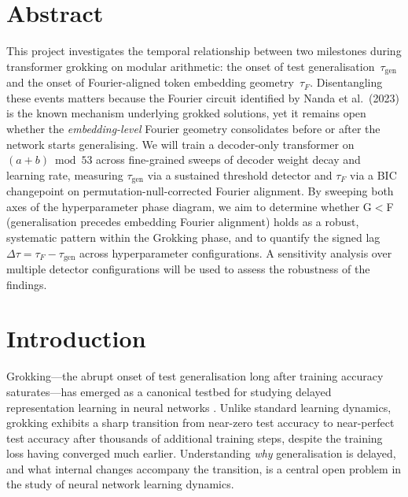 \documentclass[12pt,openany,a4paper]{book}
\newcommand{\taug}{\tau_{\mathrm{gen}}}
\newcommand{\tauf}{\tau_{F}}
\newcommand{\Dtau}{\Delta\tau}
\begin{document}
\chapter{Abstract}

This project investigates the temporal relationship between two
milestones during transformer grokking on modular arithmetic:
the onset of test generalisation~$\taug$ and the onset of
Fourier-aligned token embedding geometry~$\tauf$.
Disentangling these events matters because the Fourier circuit
identified by Nanda et al.\ (2023) is the known mechanism underlying
grokked solutions, yet it remains open whether the \emph{embedding-level}
Fourier geometry consolidates before or after the network starts
generalising.
We will train a decoder-only transformer on $(a+b)\bmod 53$ across
fine-grained sweeps of decoder weight decay and learning rate,
measuring $\taug$ via a sustained threshold detector and $\tauf$ via a
BIC changepoint on permutation-null-corrected Fourier alignment.
By sweeping both axes of the hyperparameter phase diagram, we aim to
determine whether G$<$F (generalisation precedes embedding Fourier
alignment) holds as a robust, systematic pattern within the Grokking
phase, and to quantify the signed lag $\Dtau = \tauf - \taug$ across
hyperparameter configurations.
A sensitivity analysis over multiple detector configurations will be
used to assess the robustness of the findings.

\tableofcontents

\listoffigures
{}

\listoftables
{}

\cleardoublepage
\mainmatter

\chapter{Introduction}

Grokking---the abrupt onset of test generalisation long after training
accuracy saturates---has emerged as a canonical testbed for studying
delayed representation learning in neural networks
\cite{power2022grokking}.
Unlike standard learning dynamics, grokking exhibits a sharp transition
from near-zero test accuracy to near-perfect test accuracy after
thousands of additional training steps, despite the training loss
having converged much earlier.
Understanding \emph{why} generalisation is delayed, and what internal
changes accompany the transition, is a central open problem in the
study of neural network learning dynamics.
\end{document}
